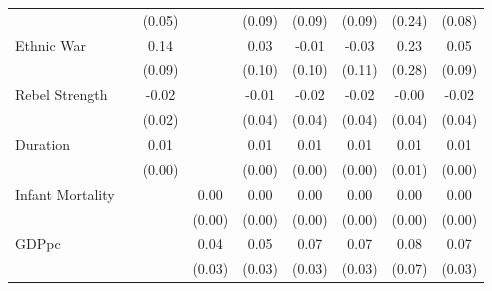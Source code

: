 \documentclass[12pt, letterpaper]{article}
\begin{document}
\begin{landscape}
\begin{table}[htbp]
\begin{footnotesize}
\begin{tabular}{l*{8}{c}}
                    &                     &      (0.05)         &                     &      (0.09)         &      (0.09)         &      (0.09)         &      (0.24)         &      (0.08)         \\
Ethnic War          &                     &        0.14\sym{+}  &                     &        0.03         &       -0.01         &       -0.03         &        0.23         &        0.05         \\
                    &                     &      (0.09)         &                     &      (0.10)         &      (0.10)         &      (0.11)         &      (0.28)         &      (0.09)         \\
Rebel Strength      &                     &       -0.02         &                     &       -0.01         &       -0.02         &       -0.02         &       -0.00         &       -0.02         \\
                    &                     &      (0.02)         &                     &      (0.04)         &      (0.04)         &      (0.04)         &      (0.04)         &      (0.04)         \\
Duration            &                     &        0.01\sym{***}&                     &        0.01\sym{*}  &        0.01\sym{*}  &        0.01\sym{*}  &        0.01\sym{+}  &        0.01\sym{*}  \\
                    &                     &      (0.00)         &                     &      (0.00)         &      (0.00)         &      (0.00)         &      (0.01)         &      (0.00)         \\
Infant Mortality    &                     &                     &        0.00         &        0.00         &        0.00         &        0.00\sym{+}  &        0.00         &        0.00         \\
                    &                     &                     &      (0.00)         &      (0.00)         &      (0.00)         &      (0.00)         &      (0.00)         &      (0.00)         \\
GDPpc               &                     &                     &        0.04\sym{+}  &        0.05\sym{+}  &        0.07\sym{*}  &        0.07\sym{**} &        0.08         &        0.07\sym{**} \\
                    &                     &                     &      (0.03)         &      (0.03)         &      (0.03)         &      (0.03)         &      (0.07)         &      (0.03)         \\

\end{tabular}
\end{footnotesize}
\end{table}
\end{landscape}
\end{document}
